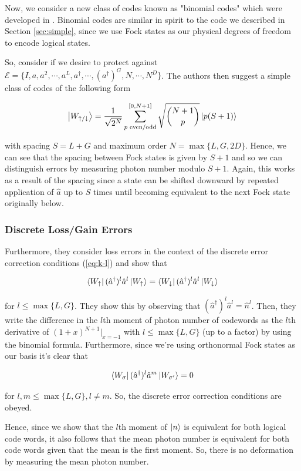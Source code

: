 \documentclass[12]{amsart}
\newcommand\0{\mathbf{0}}
\newcommand\<{\langle}
\renewcommand\>{\rangle}
\begin{document}
Now, we consider a new class of codes known as "binomial codes" which were developed in  \cite{michael2016new}. Binomial codes are similar in spirit to the code we described in Section \ref{sec:simple}, since we use Fock states as our physical degrees of freedom to encode logical states.


So, consider if we desire to protect against $\mathcal{E} = \{I, a, a^2, \cdots, a^L, a^\dag, \cdots, (a^\dag)^G, N, \cdots, N^D \}$. The authors then suggest a simple class of codes of the following form

$$
\ket{W_{\uparrow / \downarrow}} = \frac{1}{\sqrt{2^N}} \sum_{ p\text{ even/odd}}^{[0, N+1]} \sqrt{\binom{N+1}{ p }} \ket{p(S+1)}
$$

with spacing $S = L+G$ and maximum order $N = \max\{L, G, 2D\}$. Hence, we can see that the spacing between Fock states is given by $S+1$ and so we can distinguish errors by measuring photon number modulo $S+1$. Again, this works as a result of the spacing since a state can be shifted downward by repeated application of $\hat{a}$ up to $S$ times until becoming equivalent to the next Fock state originally below.

\subsubsection{Discrete Loss/Gain Errors}

 Furthermore, they consider loss errors in the context of the discrete error correction conditions (\ref{eq:k-l}) and show that

$$
\bra{W_\uparrow}(\hat{a}^\dag)^l\hat{a}^l \ket{W_{\uparrow}} = \bra{W_\downarrow}(\hat{a}^\dag)^l\hat{a}^l \ket{W_{\downarrow}}
$$ 

for $l \leq \max\{L, G\}$. They show this by observing that $(\hat{a}^\dag)^l\hat{a}^l = \hat{n}^l$. Then, they write the difference in the $l$th moment of photon number of codewords as the $l$th derivative of $(1+x)^{N+1}\vert_{x=-1}$ with $l \leq \max\{L, G\}$ (up to a factor) by using the binomial formula. Furthermore, since we're using orthonormal Fock states as our basis it's clear that

$$
\bra{W_\sigma}(\hat{a}^\dag)^l\hat{a}^m \ket{W_{\sigma'}} = 0
$$  

for $l, m \leq \max\{L, G\}, l \neq m$. So, the discrete error correction conditions are obeyed.

Hence, since we show that the $l$th moment of $\ket{n}$ is equivalent for both logical code words, it also follows that the mean photon number is equivalent for both code words given that the mean is the first moment. So, there is no deformation by measuring the mean photon number.
\end{document}
